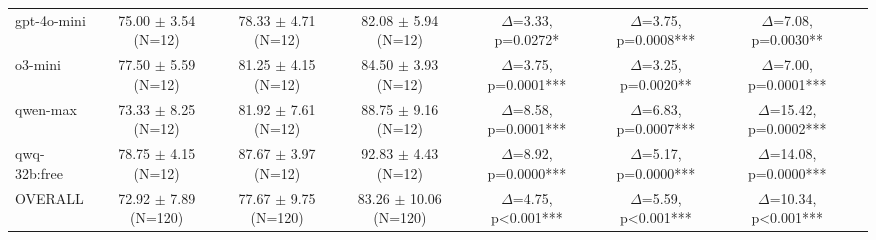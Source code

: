 \documentclass{article}
\begin{document}
\begin{table}[htbp]
{\begin{tabular}{lccccccc}
    gpt-4o-mini & 75.00 $\pm$ 3.54 (N=12) & 78.33 $\pm$ 4.71 (N=12) & 82.08 $\pm$ 5.94 (N=12) & $\Delta$=3.33, p=0.0272* & $\Delta$=3.75, p=0.0008*** & $\Delta$=7.08, p=0.0030** \\
    o3-mini & 77.50 $\pm$ 5.59 (N=12) & 81.25 $\pm$ 4.15 (N=12) & 84.50 $\pm$ 3.93 (N=12) & $\Delta$=3.75, p=0.0001*** & $\Delta$=3.25, p=0.0020** & $\Delta$=7.00, p=0.0001*** \\
    qwen-max & 73.33 $\pm$ 8.25 (N=12) & 81.92 $\pm$ 7.61 (N=12) & 88.75 $\pm$ 9.16 (N=12) & $\Delta$=8.58, p=0.0001*** & $\Delta$=6.83, p=0.0007*** & $\Delta$=15.42, p=0.0002*** \\
    qwq-32b:free & 78.75 $\pm$ 4.15 (N=12) & 87.67 $\pm$ 3.97 (N=12) & 92.83 $\pm$ 4.43 (N=12) & $\Delta$=8.92, p=0.0000*** & $\Delta$=5.17, p=0.0000*** & $\Delta$=14.08, p=0.0000*** \\
    \midrule
    OVERALL & 72.92 $\pm$ 7.89 (N=120) & 77.67 $\pm$ 9.75 (N=120) & 83.26 $\pm$ 10.06 (N=120) & $\Delta$=4.75, p<0.001*** & $\Delta$=5.59, p<0.001*** & $\Delta$=10.34, p<0.001*** \\
    \bottomrule
  \end{tabular}
  }
\end{table}
\end{document}
